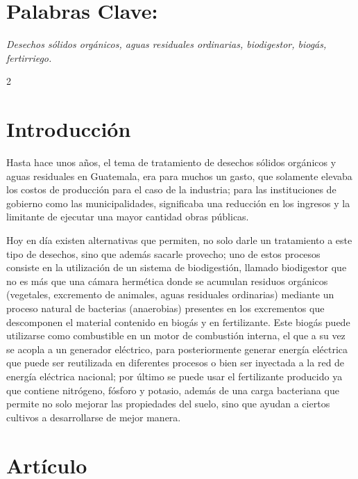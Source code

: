 \documentclass[11pt,spanish,Letterpaper,openany]{book}
\begin{document}
\hypertarget{palabras-clave-1}{%
\section*{Palabras Clave:}\label{palabras-clave-1}}

\emph{Desechos sólidos orgánicos, aguas residuales ordinarias, biodigestor, biogás, fertirriego.}

\begin {multicols}{2}

\hypertarget{introduccion-2}{%
\section{Introducción}\label{introduccion-2}}

Hasta hace unos años, el tema de tratamiento de desechos sólidos orgánicos y aguas residuales en Guatemala, era para muchos un gasto, que solamente elevaba los costos de producción para el caso de la industria; para las instituciones de gobierno como las municipalidades, significaba una reducción en los ingresos y la limitante de ejecutar una mayor cantidad obras públicas.

Hoy en día existen alternativas que permiten, no solo darle un tratamiento a este tipo de desechos, sino que además sacarle provecho; uno de estos procesos consiste en la utilización de un sistema de biodigestión, llamado biodigestor que no es más que una cámara hermética donde se acumulan residuos orgánicos (vegetales, excremento de animales, aguas residuales ordinarias) mediante un proceso natural de bacterias (anaerobias) presentes en los excrementos que descomponen el material contenido en biogás y en fertilizante. Este biogás puede utilizarse como combustible en un motor de combustión interna, el que a su vez se acopla a un generador eléctrico, para posteriormente generar energía eléctrica que puede ser reutilizada en diferentes procesos o bien ser inyectada a la red de energía eléctrica nacional; por último se puede usar el fertilizante producido ya que contiene nitrógeno, fósforo y potasio, además de una carga bacteriana que permite no solo mejorar las propiedades del suelo, sino que ayudan a ciertos cultivos a desarrollarse de mejor manera.

\hypertarget{articulo-1}{%
\section{Artículo}\label{articulo-1}}


\end{multicols}
\end{document}
